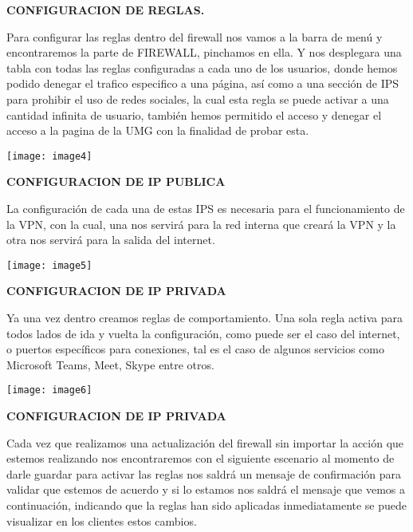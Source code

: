 \documentclass{book} %
\begin{document}
\noindent \textbf{CONFIGURACION DE REGLAS.}

\noindent Para configurar las reglas dentro del firewall nos vamos a la barra de men\'{u} y encontraremos la parte de FIREWALL, pinchamos en ella. Y nos desplegara una tabla con todas las reglas configuradas a cada uno de los usuarios, donde hemos podido denegar el trafico especifico a una p\'{a}gina, as\'{i} como a una secci\'{o}n de IPS para prohibir el uso de redes sociales, la cual esta regla se puede activar a una cantidad infinita de usuario, tambi\'{e}n hemos permitido el acceso y denegar el acceso a la pagina de la UMG con la finalidad de probar esta.

\noindent \texttt{[image: image4]}

\noindent 

\noindent \textbf{CONFIGURACION DE IP PUBLICA}

\noindent La configuraci\'{o}n de cada una de estas IPS es necesaria para el funcionamiento de la VPN, con la cual, una nos servir\'{a} para la red interna que crear\'{a} la VPN y la otra nos servir\'{a} para la salida del internet.

\noindent 

\noindent \texttt{[image: image5]}

\noindent \textbf{}

\noindent \textbf{}

\noindent \textbf{CONFIGURACION DE IP PRIVADA}

\noindent Ya una vez dentro creamos reglas de comportamiento. Una sola regla activa para todos lados de ida y vuelta la configuraci\'{o}n, como puede ser el caso del internet, o puertos espec\'{i}ficos para conexiones, tal es el caso de algunos servicios como Microsoft Teams, Meet, Skype entre otros.  

\noindent 

\noindent \texttt{[image: image6]}

\noindent 

\noindent \textbf{CONFIGURACION DE IP PRIVADA}

\noindent Cada vez que realizamos una actualizaci\'{o}n del firewall sin importar la acci\'{o}n que estemos realizando nos encontraremos con el siguiente escenario al momento de darle guardar para activar las reglas nos saldr\'{a} un mensaje de confirmaci\'{o}n para validar que estemos de acuerdo y si lo estamos nos saldr\'{a} el mensaje que vemos a continuaci\'{o}n, indicando que la reglas han sido aplicadas inmediatamente se puede visualizar en los clientes estos cambios.
\end{document}
